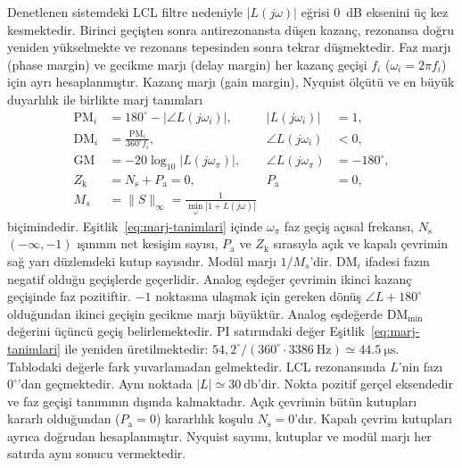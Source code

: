 Denetlenen sistemdeki LCL filtre nedeniyle $|L(j\omega)|$ eğrisi 0~dB eksenini üç kez kesmektedir. Birinci geçişten sonra antirezonansta düşen kazanç, rezonansa doğru yeniden yükselmekte ve rezonans tepesinden sonra tekrar düşmektedir. Faz marjı (phase margin) ve gecikme marjı (delay margin) her kazanç geçişi $f_i$ ($\omega_i=2\pi f_i$) için ayrı hesaplanmıştır. Kazanç marjı (gain margin), Nyquist ölçütü ve en büyük duyarlılık ile birlikte marj tanımları
\begin{equation}
  \begin{aligned}
    \mathrm{PM}_i&=180^{\circ}-\left|\angle L(j\omega_i)\right|, & |L(j\omega_i)|&=1,\\
    \mathrm{DM}_i&=\frac{\mathrm{PM}_i}{360^{\circ}f_i}, & \angle L(j\omega_i)&<0,\\
    \mathrm{GM}&=-20\log_{10}\left|L(j\omega_{\pi})\right|, & \angle L(j\omega_{\pi})&=-180^{\circ},\\
    Z_{\mathrm{k}}&=N_{\mathrm{s}}+P_{\mathrm{a}}=0, & P_{\mathrm{a}}&=0,\\
    M_s&=\|S\|_\infty=\frac{1}{\min_{\omega}\left|1+L(j\omega)\right|}
  \end{aligned}
  \label{eq:marj-tanimlari}
\end{equation}
biçimindedir. Eşitlik~\eqref{eq:marj-tanimlari} içinde $\omega_{\pi}$ faz geçiş açısal frekansı, $N_{\mathrm{s}}$ $(-\infty,-1)$ ışınının net kesişim sayısı, $P_{\mathrm{a}}$ ve $Z_{\mathrm{k}}$ sırasıyla açık ve kapalı çevrimin sağ yarı düzlemdeki kutup sayısıdır. Modül marjı $1/M_s$'dir. $\mathrm{DM}_i$ ifadesi fazın negatif olduğu geçişlerde geçerlidir. Analog eşdeğer çevrimin ikinci kazanç geçişinde faz pozitiftir. $-1$ noktasına ulaşmak için gereken dönüş $\angle L+180^{\circ}$ olduğundan ikinci geçişin gecikme marjı büyüktür. Analog eşdeğerde $\mathrm{DM}_{\min}$ değerini üçüncü geçiş belirlemektedir. PI satırındaki değer Eşitlik~\eqref{eq:marj-tanimlari} ile yeniden üretilmektedir: $54{,}2^{\circ}/(360^{\circ}\cdot\SI{3386}{\hertz})\simeq\SI{44.5}{\micro\second}$. Tablodaki değerle fark yuvarlamadan gelmektedir. LCL rezonansında $L$'nin fazı $0^{\circ}$'dan geçmektedir. Aynı noktada $|L|\simeq\SI{30}{\decibel}$'dir. Nokta pozitif gerçel eksendedir ve faz geçişi tanımının dışında kalmaktadır. Açık çevrimin bütün kutupları kararlı olduğundan ($P_{\mathrm{a}}=0$) kararlılık koşulu $N_{\mathrm{s}}=0$'dır. Kapalı çevrim kutupları ayrıca doğrudan hesaplanmıştır. Nyquist sayımı, kutuplar ve modül marjı her satırda aynı sonucu vermektedir.

